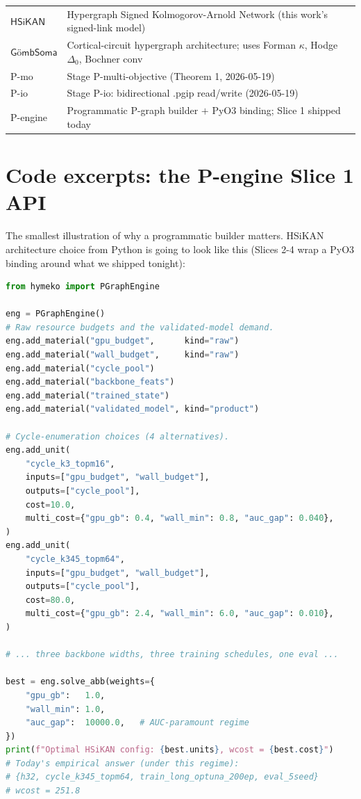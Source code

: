 \documentclass[11pt,a4paper]{article}
\theoremstyle{plain}
\theoremstyle{definition}
\begin{document}
\begin{center}
\begin{tabular}{ll}
$\mathsf{HSiKAN}$          & Hypergraph Signed Kolmogorov-Arnold Network (this work's signed-link model) \\
$\mathsf{GömbSoma}$        & Cortical-circuit hypergraph architecture; uses Forman $\kappa$, Hodge $\Delta_0$, Bochner conv \\
P-mo                       & Stage P-multi-objective (Theorem 1, 2026-05-19) \\
P-io                       & Stage P-io: bidirectional .pgip read/write (2026-05-19) \\
P-engine                   & Programmatic P-graph builder $+$ PyO3 binding; Slice 1 shipped today \\
\bottomrule
\end{tabular}
\end{center}

\section{Code excerpts: the P-engine Slice 1 API}

The smallest illustration of why a programmatic builder matters.
HSiKAN architecture choice from Python is going to look like this
(Slices 2-4 wrap a PyO3 binding around what we shipped tonight):

\begin{lstlisting}[language=Python]
from hymeko import PGraphEngine

eng = PGraphEngine()
# Raw resource budgets and the validated-model demand.
eng.add_material("gpu_budget",      kind="raw")
eng.add_material("wall_budget",     kind="raw")
eng.add_material("cycle_pool")
eng.add_material("backbone_feats")
eng.add_material("trained_state")
eng.add_material("validated_model", kind="product")

# Cycle-enumeration choices (4 alternatives).
eng.add_unit(
    "cycle_k3_topm16",
    inputs=["gpu_budget", "wall_budget"],
    outputs=["cycle_pool"],
    cost=10.0,
    multi_cost={"gpu_gb": 0.4, "wall_min": 0.8, "auc_gap": 0.040},
)
eng.add_unit(
    "cycle_k345_topm64",
    inputs=["gpu_budget", "wall_budget"],
    outputs=["cycle_pool"],
    cost=80.0,
    multi_cost={"gpu_gb": 2.4, "wall_min": 6.0, "auc_gap": 0.010},
)

# ... three backbone widths, three training schedules, one eval ...

best = eng.solve_abb(weights={
    "gpu_gb":   1.0,
    "wall_min": 1.0,
    "auc_gap":  10000.0,   # AUC-paramount regime
})
print(f"Optimal HSiKAN config: {best.units}, wcost = {best.cost}")
# Today's empirical answer (under this regime):
# {h32, cycle_k345_topm64, train_long_optuna_200ep, eval_5seed}
# wcost = 251.8
\end{lstlisting}
\end{document}
